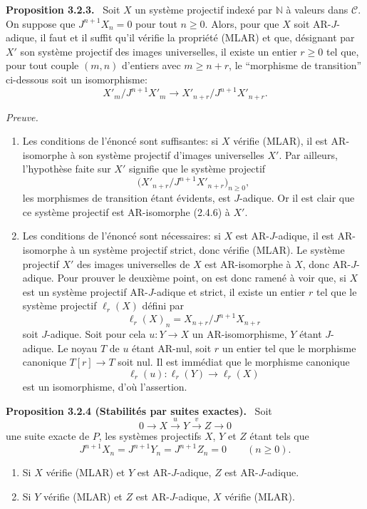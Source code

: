 \documentclass[11pt]{article}
\providecommand{\NN}{\mathbb{N}}
\newenvironment{statement}[1]{\par\medskip\noindent\textbf{#1.}\ }{\par\medskip}
\newenvironment{prooftext}[1][Proof]{\par\noindent\emph{#1.}\ }{\par\medskip}
\providecommand{\NN}{\mathbb N}
\providecommand{\cC}{\mathcal C}
\providecommand{\cC}{\mathcal C}
\begin{document}
\begin{statement}{Proposition 3.2.3}
Soit $X$ un système projectif indexé par $\NN$ à valeurs dans $\cC$. On suppose que $J^{n+1}X_n=0$ pour tout $n\ge0$. Alors, pour que $X$ soit AR-$J$-adique, il faut et il suffit qu'il vérifie la propriété (MLAR) et que, désignant par $X'$ son système projectif des images universelles, il existe un entier $r\ge0$ tel que, pour tout couple $(m,n)$ d'entiers avec $m\ge n+r$, le ``morphisme de transition'' ci-dessous soit un isomorphisme:
\[
X'_m/J^{n+1}X'_m\longrightarrow X'_{n+r}/J^{n+1}X'_{n+r}.
\]
\end{statement}

\begin{prooftext}[Preuve]
\begin{enumerate}[label=(\alph*)]
\item Les conditions de l'énoncé sont suffisantes: si $X$ vérifie (MLAR), il est AR-isomorphe à son système projectif d'images universelles $X'$. Par ailleurs, l'hypothèse faite sur $X'$ signifie que le système projectif
\[
\bigl(X'_{n+r}/J^{n+1}X'_{n+r}\bigr)_{n\ge0},
\]
les morphismes de transition étant évidents, est $J$-adique. Or il est clair que ce système projectif est AR-isomorphe (2.4.6) à $X'$.
\item Les conditions de l'énoncé sont nécessaires: si $X$ est AR-$J$-adique, il est AR-isomorphe à un système projectif strict, donc vérifie (MLAR). Le système projectif $X'$ des images universelles de $X$ est AR-isomorphe à $X$, donc AR-$J$-adique. Pour prouver le deuxième point, on est donc ramené à voir que, si $X$ est un système projectif AR-$J$-adique et strict, il existe un entier $r$ tel que le système projectif $\ell_r(X)$ défini par
\[
\ell_r(X)_n=X_{n+r}/J^{n+1}X_{n+r}
\]
soit $J$-adique. Soit pour cela $u:Y\to X$ un AR-isomorphisme, $Y$ étant $J$-adique. Le noyau $T$ de $u$ étant AR-nul, soit $r$ un entier tel que le morphisme canonique $T[r]\to T$ soit nul. Il est immédiat que le morphisme canonique
\[
\ell_r(u):\ell_r(Y)\longrightarrow\ell_r(X)
\]
est un isomorphisme, d'où l'assertion.
\end{enumerate}
\end{prooftext}

\begin{statement}{Proposition 3.2.4 (Stabilités par suites exactes)}
Soit
\[
0\longrightarrow X\stackrel{u}{\longrightarrow}Y\stackrel{v}{\longrightarrow}Z\longrightarrow0
\]
une suite exacte de $P$, les systèmes projectifs $X$, $Y$ et $Z$ étant tels que
\[
J^{n+1}X_n=J^{n+1}Y_n=J^{n+1}Z_n=0\qquad(n\ge0).
\]
\begin{enumerate}[label=(\roman*)]
\item Si $X$ vérifie (MLAR) et $Y$ est AR-$J$-adique, $Z$ est AR-$J$-adique.
\item Si $Y$ vérifie (MLAR) et $Z$ est AR-$J$-adique, $X$ vérifie (MLAR).
\end{enumerate}
\end{statement}
\end{document}
